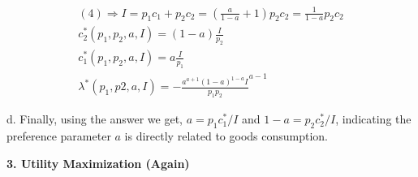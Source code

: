 \documentclass[12pt]{article}
\begin{document}
\begin{description}
\begin{gather*}
    \\
    (4) \Rightarrow I = p_1c_1 + p_2c_2 = (\frac{a}{1-a} + 1)p_2c_2 = \frac{1}{1-a}p_2c_2
    \\
    c_2^*(p_1,p_2,a,I) = (1-a)\frac{I}{p_2} \\
    c_1^*(p_1,p_2,a,I) = a\frac{I}{p_1} \\ 
    \lambda^*(p_1,p2,a,I) = -\frac{a^{a+1}(1-a)^{1-a}I}{p_1p_2}^{a-1}
\end{gather*}
\item d. Finally, using the answer we get, \newline 
$a = p_1c_1^*/I$ and $1-a = p_2c_2^*/I$, indicating the preference parameter $a$ is directly related to goods consumption. 
\end{description}

\pagebreak{}
{\bfseries 3. Utility Maximization (Again)}
\end{document}
